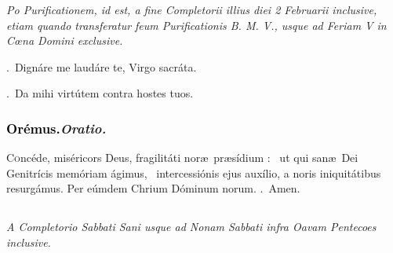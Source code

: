 \documentclass[12pt]{article} %
\newenvironment{rubric}{\color{benred8} \itshape \leftskip 0in \setlength{\parindent}{0.25in}}{\vspace{2 mm}}
\newenvironment{response}{\leftskip 0in \setlength{\parindent}{0in}}{\vspace{2 mm}}
\let\oldgresixstar\gresixstar
\renewcommand{\gresixstar}{\textcolor{benred8}{\oldgresixstar}}
\let\oldgredagger\gredagger
\renewcommand{\gredagger}{\textcolor{benred8}{\oldgredagger}}
\let\oldVbar\Vbar
\renewcommand{\Vbar}{\textcolor{benred8}{\oldVbar .}}
\let\oldRbar\Rbar
\renewcommand{\Rbar}{\textcolor{benred8}{\oldRbar .}}
\def\capitulumSpace{\hspace{20 mm}}
\begin{document}

\newpage

\begin{rubric}Po Purificationem, id est, a fine Completorii illius diei 2 Februarii inclusive, etiam quando transferatur feum Purificationis B. M. V., usque ad Feriam V in C\oe na Domini exclusive.\end{rubric}


\gresetfirstlineaboveinitial{\small \textsc{ \textbf{\textcolor{benred8}{VI}}}}{\small \textsc{ \textbf{\textcolor{benred8}{VI}}}}

\vspace{2mm}

\begin{response}
\Vbar\ Dign\'{a}re me laud\'{a}re te, Virgo sacr\'{a}ta.

\Rbar\ Da mihi virt\'{u}tem contra hostes tuos.

\end{response}

\subsubsection*{\textcolor{black}{Or\'{e}mus.}\capitulumSpace \emph{Oratio.}}

\begin{response}\lettrine{C}{o}nc\'{e}de, mis\'{e}ricors Deus, fragilit\'{a}ti nor\ae\ pr\ae s\'{i}dium : \gredagger\ ut qui san\ae\ Dei Genitr\'{i}cis mem\'{o}riam \'{a}gimus, \gresixstar\ intercessi\'{o}nis ejus aux\'{i}lio, a noris iniquit\'{a}tibus resurg\'{a}mus. Per e\'{u}mdem Chrium D\'{o}minum norum. \Rbar\ Amen.

\end{response}


\subsection*{}

\begin{rubric}
A Completorio Sabbati Sani usque ad Nonam Sabbati infra Oavam Pentecoes inclusive.

\end{rubric}
\end{document}
